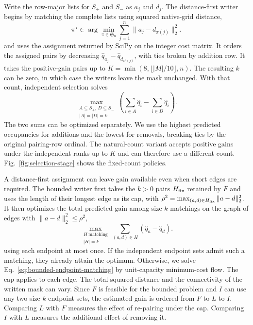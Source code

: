 \documentclass[journal]{IEEEtran}
\begin{document}
Write the row-major lists for \(S_+\) and \(S_-\) as \(a_j\) and \(d_j\). The distance-first writer begins by matching the complete lists using squared native-grid distance,
\begin{equation}
\pi^\star\in\arg\min_{\pi\in\mathfrak S_n}
  \sum_{j=1}^n\|a_j-d_{\pi(j)}\|_2^2 .
\label{eq:fixed-assignment}
\end{equation}
and uses the assignment returned by SciPy on the integer cost matrix. It orders the assigned pairs by decreasing \(\widehat q_{a_j}-\widehat q_{d_{\pi^\star(j)}}\), with ties broken by addition row. It takes the positive-gain pairs up to \(K=\min(8,\lfloor |M|/10\rfloor,n)\). The resulting \(k\) can be zero, in which case the writers leave the mask unchanged. With that count, independent selection solves
\begin{equation}
\max_{\substack{A\subseteq S_+,\,D\subseteq S_-\\ |A|=|D|=k}}
  \left(\sum_{i\in A}\widehat q_i-\sum_{i\in D}\widehat q_i\right).
\label{eq:independent-estimated-gain}
\end{equation}
The two sums can be optimized separately. We use the highest predicted occupancies for additions and the lowest for removals, breaking ties by the original pairing-row ordinal. The natural-count variant accepts positive gains under the independent ranks up to \(K\) and can therefore use a different count. Fig.~\ref{fig:selection-stage} shows the fixed-count policies.

A distance-first assignment can leave gain available even when short edges are required. The bounded writer first takes the \(k>0\) pairs \(H_{\rm fix}\) retained by \(F\) and uses the length of their longest edge as its cap, with \(\rho^2=\max_{(a,d)\in H_{\rm fix}}\|a-d\|_2^2\). It then optimizes the total predicted gain among size-\(k\) matchings on the graph of edges with \(\|a-d\|_2^2\le\rho^2\),
\begin{equation}
\max_{\substack{H\ \text{matching}\\ |H|=k}}
\sum_{(a,d)\in H}(\widehat q_a-\widehat q_d).
\label{eq:bounded-endpoint-matching}
\end{equation}
using each endpoint at most once. If the independent endpoint sets admit such a matching, they already attain the optimum. Otherwise, we solve Eq.~\eqref{eq:bounded-endpoint-matching} by unit-capacity minimum-cost flow. The cap applies to each edge. The total squared distance and the connectivity of the written mask can vary. Since \(F\) is feasible for the bounded problem and \(I\) can use any two size-\(k\) endpoint sets, the estimated gain is ordered from \(F\) to \(L\) to \(I\). Comparing \(L\) with \(F\) measures the effect of re-pairing under the cap. Comparing \(I\) with \(L\) measures the additional effect of removing it.
\end{document}
